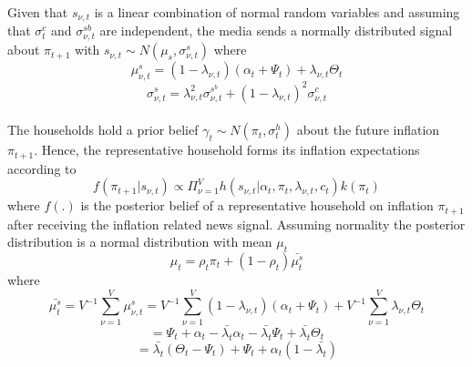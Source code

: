 \documentclass[review]{elsarticle}
\begin{document}
\\
Given that $s_{\nu,t}$ is a linear combination of normal random variables and assuming that
$\sigma^c_t$ and $\sigma^{sb}_{\nu,t}$ are independent, the media sends a normally distributed signal about $\pi_{t+1}$ with $s_{\nu,t} \sim N(\mu_s, \sigma^s_{\nu,t})$ where 
\begin{equation} 
\mu_{\nu,t}^s = (1-\lambda_{\nu,t}) (\alpha_t + \Psi_t) + \lambda_{\nu,t} \Theta_t 
\end{equation}
\begin{equation}
\sigma_{\nu,t}^s = \lambda_{\nu,t}^2 \sigma_{\nu,t}^{s^b} + (1- \lambda_{\nu,t})^2 \sigma^c_{\nu,t}
\end{equation}
\\
The households hold a prior belief $\gamma_t \sim N(\pi_t, \sigma^h_t)$ about the future inflation $\pi_{t+1}$. Hence, the representative household forms its inflation expectations according to
\begin{equation}
f(\pi_{t+1}|s_{\nu,t}) \propto \Pi^V_{\nu = 1} h(s_{\nu,t}|\alpha_t, \pi_t, \lambda_{\nu,t}, c_t) k(\pi_t)
\end{equation}
where $f(.)$ is the posterior belief of a representative household on inflation $\pi_{t+1}$ after receiving the inflation related news signal. Assuming normality the posterior distribution is a normal distribution with mean $\mu_t$
\begin{equation}
\mu_t = \rho_t \pi_t + (1- \rho_t) \bar{\mu_t^s} 
\end{equation}
where
\begin{equation}
\bar{\mu_t^s} = V^{-1} \sum^V_{\nu = 1} \mu_{\nu,t}^s = V^{-1} \sum^V_{\nu =1} (1-\lambda_{\nu,t}) (\alpha_t + \Psi_t) + V^{-1} \sum^V_{\nu =1} \lambda_{\nu,t} \Theta_t  
\end{equation}
\begin{equation}
=\Psi_t + \alpha_t - \bar{\lambda_t} \alpha_t - \bar{\lambda_t} \Psi_t + \bar{\lambda_t}\Theta_t 
\end{equation}
\begin{equation}
=\bar{\lambda_t}(\Theta_t - \Psi_t) + \Psi_t+ \alpha_t(1- \bar{\lambda_t})
\end{equation}
\end{document}
